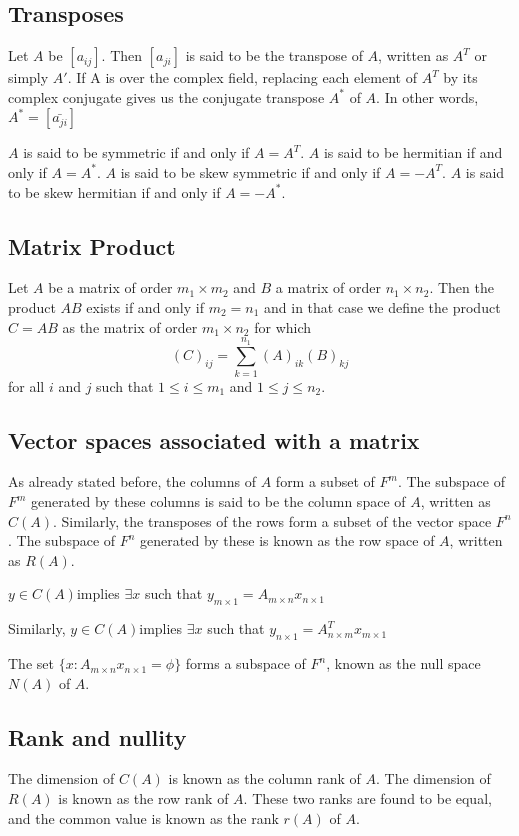 \subsection{Transposes}
Let $A$ be $[a_{ij}]$. Then $[a_{ji}]$ is said to be the transpose of $A$, written as $A^T$ or simply $A'$. If A is over the complex field, replacing each element of $A^T$ by its complex conjugate gives us the conjugate transpose $A^*$ of $A$. In other words, $A^*=[\bar {a_{ji}}]$

$A$ is said to be symmetric if and only if $A=A^T$. $A$ is said to be hermitian if and only if $A=A^*$. $A$ is said to be skew symmetric if and only if $A=-A^T$. $A$ is said to be skew hermitian if and only if $A=-A^*$.

\subsection{Matrix Product}
Let $A$ be a matrix of order $m_1 \times m_2$ and $B$ a matrix of order $n_1 \times n_2$. Then the product $AB$ exists if and only if $m_2=n_1$ and in that case we define the product $C=AB$ as the matrix of order $m_1 \times n_2$ for which\[(C)_{ij}=\sum ^{n_1} _{k=1} (A)_{ik} (B)_{kj}\]for all $i$ and $j$ such that $1\le i\le m_1$ and $1\le j\le n_2$.

\subsection{Vector spaces associated with a matrix}
As already stated before, the columns of $A$ form a subset of $F^m$. The subspace of $F^m$ generated by these columns is said to be the column space of $A$, written as $C(A)$. Similarly, the transposes of the rows form a subset of the vector space $F^n$. The subspace of $F^n$ generated by these is known as the row space of $A$, written as $R(A)$.

$y \in C(A)$implies $\exists x$ such that $y_{m \times 1} = A_{m \times n} x_{n \times 1}$

Similarly, $y \in C(A)$implies $\exists x$ such that $y_{n \times 1} = A^T_{n \times m} x_{m \times 1}$

The set $\{x:A_{m \times n}x_{n \times 1} = \phi\}$ forms a subspace of $F^n$, known as the null space $N(A)$ of $A$.

\subsection{Rank and nullity}
The dimension of $C(A)$ is known as the column rank of $A$. The dimension of $R(A)$ is known as the row rank of $A$. These two ranks are found to be equal, and the common value is known as the rank $r(A)$ of $A$.

